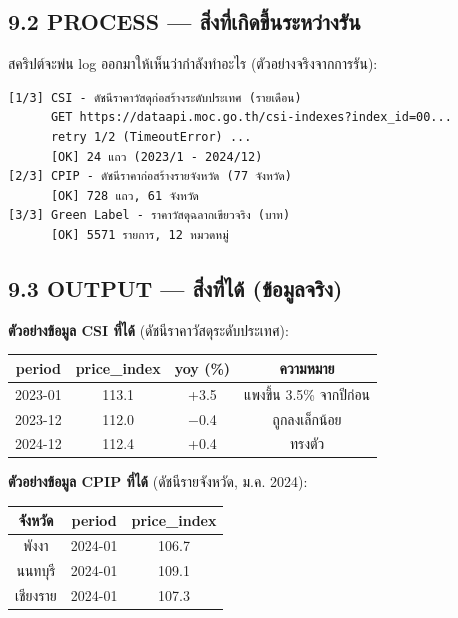\documentclass[12pt,a4paper]{article}
\begin{document}
\subsection*{9.2 PROCESS — สิ่งที่เกิดขึ้นระหว่างรัน}

สคริปต์จะพ่น log ออกมาให้เห็นว่ากำลังทำอะไร (ตัวอย่างจริงจากการรัน):

\begin{lstlisting}[style=py,numbers=none,basicstyle=\ttfamily\scriptsize]
[1/3] CSI - ดัชนีราคาวัสดุก่อสร้างระดับประเทศ (รายเดือน)
      GET https://dataapi.moc.go.th/csi-indexes?index_id=00...
      retry 1/2 (TimeoutError) ...
      [OK] 24 แถว (2023/1 - 2024/12)
[2/3] CPIP - ดัชนีราคาก่อสร้างรายจังหวัด (77 จังหวัด)
      [OK] 728 แถว, 61 จังหวัด
[3/3] Green Label - ราคาวัสดุฉลากเขียวจริง (บาท)
      [OK] 5571 รายการ, 12 หมวดหมู่
\end{lstlisting}

\subsection*{9.3 OUTPUT — สิ่งที่ได้ (ข้อมูลจริง)}

\textbf{ตัวอย่างข้อมูล CSI ที่ได้} (ดัชนีราคาวัสดุระดับประเทศ):

\begin{center}
\begin{tabular}{cccc}
\toprule
\textbf{period} & \textbf{price\_index} & \textbf{yoy (\%)} & \textbf{ความหมาย} \\
\midrule
2023-01 & 113.1 & +3.5 & แพงขึ้น 3.5\% จากปีก่อน \\
2023-12 & 112.0 & $-$0.4 & ถูกลงเล็กน้อย \\
2024-12 & 112.4 & +0.4 & ทรงตัว \\
\bottomrule
\end{tabular}
\end{center}

\vspace{0.8em}
\textbf{ตัวอย่างข้อมูล CPIP ที่ได้} (ดัชนีรายจังหวัด, ม.ค. 2024):

\begin{center}
\begin{tabular}{ccc}
\toprule
\textbf{จังหวัด} & \textbf{period} & \textbf{price\_index} \\
\midrule
พังงา & 2024-01 & 106.7 \\
นนทบุรี & 2024-01 & 109.1 \\
เชียงราย & 2024-01 & 107.3 \\
\bottomrule
\end{tabular}
\end{center}
\end{document}
